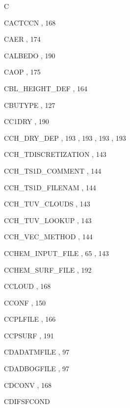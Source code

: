 \begin{theindex}
C
  \item CACTCCN
    \subitem {},  168
  \item CAER
    \subitem {},  174
  \item CALBEDO
    \subitem {},  190
  \item CAOP
    \subitem {},  175
  \item CBL\_HEIGHT\_DEF
    \subitem {},  164
  \item CBUTYPE
    \subitem {},  127
  \item CC1DRY
    \subitem {},  190
  \item CCH\_DRY\_DEP
    \subitem {},  193
    \subitem {},  193
    \subitem {},  193
    \subitem {},  193
  \item CCH\_TDISCRETIZATION
    \subitem {},  143
  \item CCH\_TS1D\_COMMENT
    \subitem {},  144
  \item CCH\_TS1D\_FILENAM
    \subitem {},  144
  \item CCH\_TUV\_CLOUDS
    \subitem {},  143
  \item CCH\_TUV\_LOOKUP
    \subitem {},  143
  \item CCH\_VEC\_METHOD
    \subitem {},  144
  \item CCHEM\_INPUT\_FILE
    \subitem {},  65
    \subitem {},  143
  \item CCHEM\_SURF\_FILE
    \subitem {},  192
  \item CCLOUD
    \subitem {},  168
  \item CCONF
    \subitem {},  150
  \item CCPLFILE
    \subitem {},  166
  \item CCPSURF
    \subitem {},  191
  \item CDADATMFILE
    \subitem {},  97
  \item CDADBOGFILE
    \subitem {},  97
  \item CDCONV
    \subitem {},  168
  \item CDIFSFCOND

\end{theindex}
